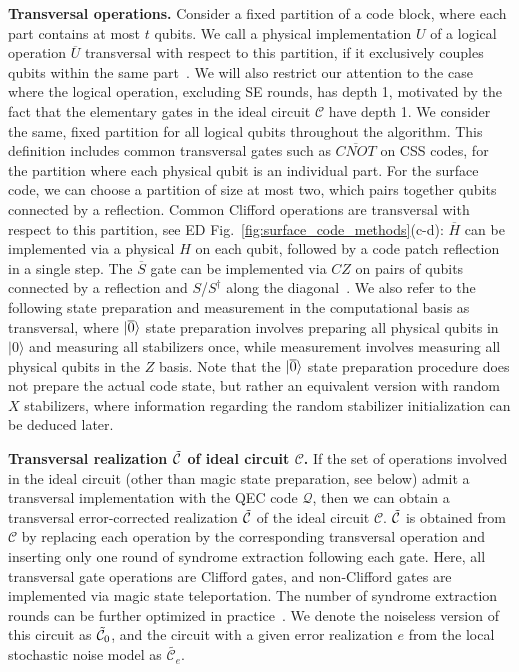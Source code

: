 \textbf{Transversal operations.}
%
Consider a fixed partition of a code block, where each part contains at most $t$ qubits.
%
We call a physical implementation $U$ of a logical operation $\overline{U}$ transversal with respect to this partition, if it exclusively couples qubits within the same part~\cite{eastin2009restrictions,jochym-oconnor2018disjointness}.
%
We will also restrict our attention to the case where the logical operation, excluding SE rounds, has depth 1, motivated by the fact that the elementary gates in the ideal circuit $\mathcal{C}$ have depth 1.
%
We consider the same, fixed partition for all logical qubits throughout the algorithm.
%
This definition includes common transversal gates such as $\overline{CNOT}$ on CSS codes, for the partition where each physical qubit is an individual part.
%
For the surface code, we can choose a partition of size at most two, which pairs together qubits connected by a reflection.
%
Common Clifford operations are transversal with respect to this partition, see ED Fig.~\ref{fig:surface_code_methods}(c-d): $\overline{H}$ can be implemented via a physical $H$ on each qubit, followed by a code patch reflection in a single step.
%
The $\overline{S}$ gate can be implemented via $CZ$ on pairs of qubits connected by a reflection and $S$/$S^\dagger$ along the diagonal~\cite{kubica2015unfolding,moussa2016transversal,breuckmann2024fold,quintavalle2023partitioning}.
%
We also refer to the following state preparation and measurement in the computational basis as transversal, where $|{\overline{0}}\rangle$ state preparation involves preparing all physical qubits in $|0\rangle$ and measuring all stabilizers once, while measurement involves measuring all physical qubits in the $Z$ basis.
%
Note that the $|{\overline{0}}\rangle$ state preparation procedure does not prepare the actual code state, but rather an equivalent version with random $X$ stabilizers, where information regarding the random stabilizer initialization can be deduced later.


\textbf{Transversal realization $\tilde{\mathcal{C}}$ of ideal circuit $\mathcal{C}$.}
%
If the set of operations involved in the ideal circuit (other than magic state preparation, see below) admit a transversal implementation with the QEC code $\mathcal{Q}$, then we can obtain a transversal error-corrected realization $\tilde{\mathcal{C}}$ of the ideal circuit $\mathcal{C}$.
%
$\tilde{\mathcal{C}}$ is obtained from $\mathcal{C}$ by replacing each operation by the corresponding transversal operation and inserting only one round of syndrome extraction following each gate.
%
Here, all transversal gate operations are Clifford gates, and non-Clifford gates are implemented via magic state teleportation.
%
The number of syndrome extraction rounds can be further optimized in practice~\cite{cain2024correlated}.
%
We denote the noiseless version of this circuit as $\tilde{\mathcal{C}}_0$, and the circuit with a given error realization $e$ from the local stochastic noise model as $\tilde{\mathcal{C}_e}$.

